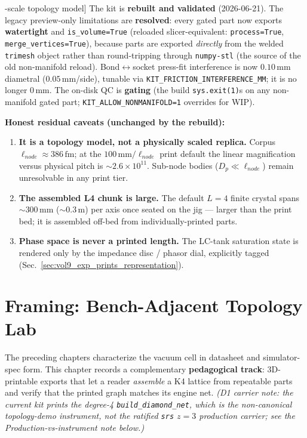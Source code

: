 \begin{warningbox}[Scope and residual caveats --- a [RENDERING]-scale topology model]
The kit is \textbf{rebuilt and validated} (2026-06-21). The legacy preview-only limitations are \textbf{resolved}: every gated part now exports \textbf{watertight} and \texttt{is\_volume=True} (reloaded slicer-equivalent: \texttt{process=True}, \texttt{merge\_vertices=True}), because parts are exported \emph{directly} from the welded \texttt{trimesh} object rather than round-tripping through \texttt{numpy-stl} (the source of the old non-manifold reload). Bond$\leftrightarrow$socket press-fit interference is now $\mathbf{0.10\,\mathrm{mm}}$ diametral ($0.05\,\mathrm{mm}$/side), tunable via \texttt{KIT\_FRICTION\_INTERFERENCE\_MM}; it is no longer $0\,\mathrm{mm}$. The on-disk QC is \textbf{gating} (the build \texttt{sys.exit(1)}s on any non-manifold gated part; \texttt{KIT\_ALLOW\_NONMANIFOLD=1} overrides for WIP).

\textbf{Honest residual caveats (unchanged by the rebuild):}
\begin{enumerate}
    \item \textbf{It is a topology model, not a physically scaled replica.} Corpus $\ell_{node} \approx 386\,\mathrm{fm}$; at the $100\,\mathrm{mm}/\ell_{node}$ print default the linear magnification versus physical pitch is $\sim\!2.6\times10^{11}$. Sub-node bodies ($D_p \ll \ell_{node}$) remain unresolvable in any print tier.
    \item \textbf{The assembled L4 chunk is large.} The default $L=4$ finite crystal spans $\sim\!300\,\mathrm{mm}$ ($\sim\!0.3\,\mathrm{m}$) per axis once seated on the jig --- larger than the print bed; it is assembled off-bed from individually-printed parts.
    \item \textbf{Phase space is never a printed length.} The LC-tank saturation state is rendered only by the impedance disc / phasor dial, explicitly tagged (Sec.~\ref{sec:vol9_exp_prints_representation}).
\end{enumerate}
\end{warningbox}

\section{Framing: Bench-Adjacent Topology Lab}
\label{sec:vol9_exp_prints_framing}

The preceding chapters characterize the vacuum cell in datasheet and simulator-spec form. This chapter records a complementary \textbf{pedagogical track}: 3D-printable exports that let a reader \emph{assemble} a K4 lattice from repeatable parts and verify that the printed graph matches its engine net. \emph{(D1 carrier note: the current kit prints the degree-4 \texttt{build\_diamond\_net}, which is the non-canonical topology-demo instrument, not the ratified \texttt{srs} $z=3$ production carrier; see the Production-vs-instrument note below.)}

